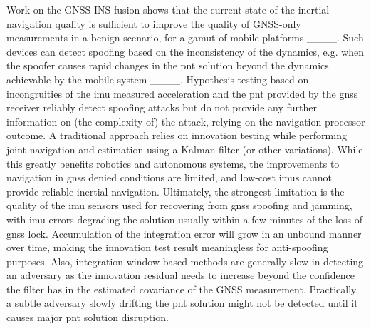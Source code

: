 Work on the GNSS-INS fusion shows that the current state of the inertial navigation quality is sufficient to improve the quality of GNSS-only measurements in a benign scenario, for a gamut of mobile platforms ____. Such devices can detect spoofing based on the inconsistency of the dynamics, e.g. when the spoofer causes rapid changes in the \gls{pnt} solution beyond the dynamics achievable by the mobile system ____. Hypothesis testing based on incongruities of the \gls{imu} measured acceleration and the \gls{pnt} provided by the \gls{gnss} receiver reliably detect spoofing attacks but do not provide any further information on (the complexity of) the attack, relying on the navigation processor outcome. A traditional approach relies on innovation testing while performing joint navigation and estimation using a Kalman filter (or other variations). While this greatly benefits robotics and autonomous systems, the improvements to navigation in \gls{gnss} denied conditions are limited, and low-cost \gls{imu}s cannot provide reliable inertial navigation. Ultimately, the strongest limitation is the quality of the \gls{imu} sensors used for recovering from \gls{gnss} spoofing and jamming, with \gls{imu} errors degrading the solution usually within a few minutes of the loss of \gls{gnss} lock. Accumulation of the integration error will grow in an unbound manner over time, making the innovation test result meaningless for anti-spoofing purposes. 
Also, integration window-based methods are generally slow in detecting an adversary as the innovation residual needs to increase beyond the confidence the filter has in the estimated covariance of the GNSS measurement. Practically, a subtle adversary slowly drifting the \gls{pnt} solution might not be detected until it causes major \gls{pnt} solution disruption.



